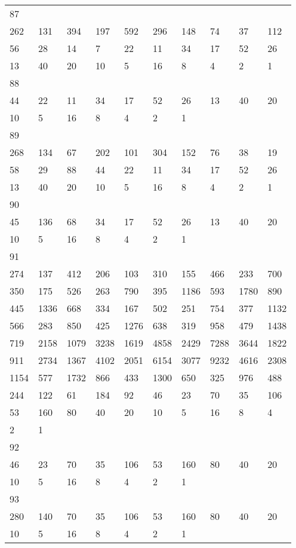 \begin{longtable}{*{10}{l}}
87&&&&&&&&&\\
262& 131& 394& 197& 592& 296& 148& 74& 37& 112\\
56& 28& 14& 7& 22& 11& 34& 17& 52& 26\\
13& 40& 20& 10& 5& 16& 8& 4& 2& 1\\

88&&&&&&&&&\\
44& 22& 11& 34& 17& 52& 26& 13& 40& 20\\
10& 5& 16& 8& 4& 2& 1& \\

89&&&&&&&&&\\
268& 134& 67& 202& 101& 304& 152& 76& 38& 19\\
58& 29& 88& 44& 22& 11& 34& 17& 52& 26\\
13& 40& 20& 10& 5& 16& 8& 4& 2& 1\\

90&&&&&&&&&\\
45& 136& 68& 34& 17& 52& 26& 13& 40& 20\\
10& 5& 16& 8& 4& 2& 1& \\

91&&&&&&&&&\\
274& 137& 412& 206& 103& 310& 155& 466& 233& 700\\
350& 175& 526& 263& 790& 395& 1186& 593& 1780& 890\\
445& 1336& 668& 334& 167& 502& 251& 754& 377& 1132\\
566& 283& 850& 425& 1276& 638& 319& 958& 479& 1438\\
719& 2158& 1079& 3238& 1619& 4858& 2429& 7288& 3644& 1822\\
911& 2734& 1367& 4102& 2051& 6154& 3077& 9232& 4616& 2308\\
1154& 577& 1732& 866& 433& 1300& 650& 325& 976& 488\\
244& 122& 61& 184& 92& 46& 23& 70& 35& 106\\
53& 160& 80& 40& 20& 10& 5& 16& 8& 4\\
2& 1& \\

92&&&&&&&&&\\
46& 23& 70& 35& 106& 53& 160& 80& 40& 20\\
10& 5& 16& 8& 4& 2& 1& \\

93&&&&&&&&&\\
280& 140& 70& 35& 106& 53& 160& 80& 40& 20\\
10& 5& 16& 8& 4& 2& 1& \\


\end{longtable}
